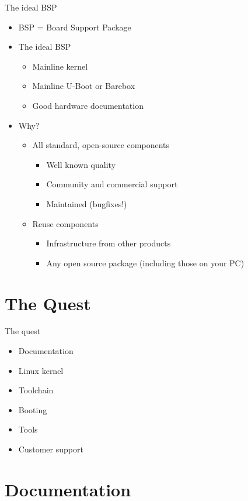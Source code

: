 \documentclass[xetex,table]{beamer}
\begin{document}
\begin{frame}{The ideal BSP}
  \begin{itemize}
  \item BSP = Board Support Package
  \item The ideal BSP
    \begin{itemize}
    \item Mainline kernel
    \item Mainline U-Boot or Barebox
    \item Good hardware documentation
    \end{itemize}
  \item Why?
    \begin{itemize}
    \item All standard, open-source components
      \begin{itemize}
      \item Well known quality
      \item Community and commercial support
      \item Maintained (bugfixes!)
      \end{itemize}
    \item Reuse components
      \begin{itemize}
      \item Infrastructure from other products
      \item Any open source package (including those on your PC)
      \end{itemize}
    \end{itemize}
  \end{itemize}
\end{frame}

\section{The Quest}

\begin{frame}{The quest}
  \begin{itemize}
  \item Documentation
  \item Linux kernel
  \item Toolchain
  \item Booting
  \item Tools
  \item Customer support
  \end{itemize}
\end{frame}

\section{Documentation}
\end{document}
